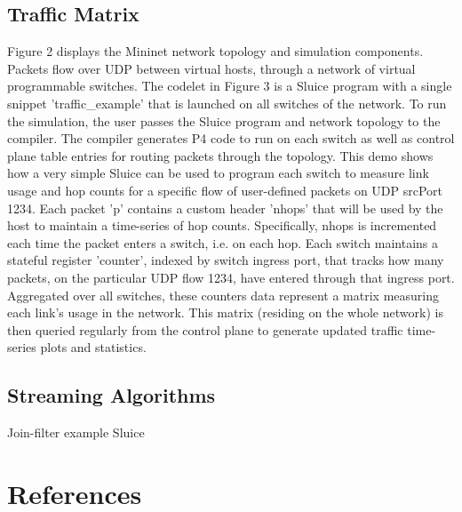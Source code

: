\subsection{Traffic Matrix}
Figure 2 displays the Mininet network topology and simulation components. Packets flow over UDP between virtual hosts, through a network of virtual programmable switches. The codelet in Figure 3 is a Sluice program with a single snippet 'traffic\_example' that is launched on all switches of the network. To run the simulation, the user passes the Sluice program and network topology to the compiler. The compiler generates P4 code to run on each switch as well as control plane table entries for routing packets through the topology.  
    This demo shows how a very simple Sluice can be used to program each switch to measure link usage and hop counts for a specific flow of user-defined packets on UDP srcPort 1234. Each packet 'p' contains a custom header 'nhops' that will be used by the host to maintain a time-series of hop counts. Specifically, nhops is incremented each time the packet enters a switch, i.e. on each hop. Each switch maintains a stateful register 'counter', indexed by switch ingress port, that tracks how many packets, on the particular UDP flow 1234, have entered through that ingress port. Aggregated over all switches, these counters data represent a matrix measuring each link's usage in the network. This matrix (residing on the whole network) is then queried regularly from the control plane to generate updated traffic time-series plots and statistics.  
\subsection{Streaming Algorithms}
Join-filter example Sluice

\section{References}

